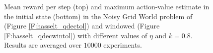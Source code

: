 \documentclass[conference]{IEEEtran}
\begin{document}
\begin{figure}[t]
\begin{minipage}{\columnwidth}
\end{minipage}
  \caption{Mean reward per step (top) and maximum action-value estimate in the initial state (bottom) in the Noisy Grid World problem of \alg (Figure \ref{F:hasselt_qdectol}) and windowed \alg (Figure \ref{F:hasselt_qdecwintol}) with different values of $\eta$ and $k = 0.8$. Results are averaged over $10000$ experiments.}
  \label{F:hasselt_QDecTol}
\end{figure}
\end{document}
